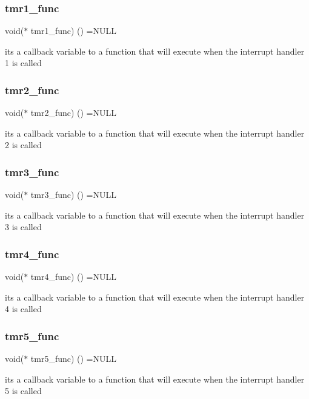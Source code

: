 \subsubsection{tmr1\+\_\+func}
{\footnotesize\ttfamily void($\ast$ tmr1\+\_\+func) () =N\+U\+LL}

it\textquotesingle{}s a callback variable to a function that will execute when the interrupt handler 1 is called \mbox{\label{timer__libs_8c_a32d642fb3357fd7c99dafad4f17885e8}} 
\subsubsection{tmr2\+\_\+func}
{\footnotesize\ttfamily void($\ast$ tmr2\+\_\+func) () =N\+U\+LL}

it\textquotesingle{}s a callback variable to a function that will execute when the interrupt handler 2 is called \mbox{\label{timer__libs_8c_a68d6c55fc25c77cde3f602c4a34c4869}} 
\subsubsection{tmr3\+\_\+func}
{\footnotesize\ttfamily void($\ast$ tmr3\+\_\+func) () =N\+U\+LL}

it\textquotesingle{}s a callback variable to a function that will execute when the interrupt handler 3 is called \mbox{\label{timer__libs_8c_a42b8c19ef88770d60bcb3cf34d2f0acd}} 
\subsubsection{tmr4\+\_\+func}
{\footnotesize\ttfamily void($\ast$ tmr4\+\_\+func) () =N\+U\+LL}

it\textquotesingle{}s a callback variable to a function that will execute when the interrupt handler 4 is called \mbox{\label{timer__libs_8c_a8620a4d79b6af2e082b58843b1a7c677}} 
\subsubsection{tmr5\+\_\+func}
{\footnotesize\ttfamily void($\ast$ tmr5\+\_\+func) () =N\+U\+LL}

it\textquotesingle{}s a callback variable to a function that will execute when the interrupt handler 5 is called 
